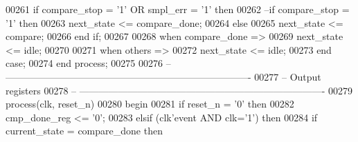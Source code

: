 \begin{DoxyCode}
00261          \textcolor{keywordflow}{if} \textcolor{vhdlchar}{compare_stop} \textcolor{vhdlchar}{=} \textcolor{vhdlchar}{'}\textcolor{vhdllogic}{}\textcolor{vhdllogic}{1}\textcolor{vhdlchar}{'} \textcolor{keywordflow}{OR} \textcolor{vhdlchar}{smpl_err} \textcolor{vhdlchar}{=} \textcolor{vhdlchar}{'}\textcolor{vhdllogic}{}\textcolor{vhdllogic}{1}\textcolor{vhdlchar}{'} \textcolor{keywordflow}{then}
00262 \textcolor{keyword}{         --if compare\_stop = '1' then}
00263             \textcolor{vhdlchar}{next_state} \textcolor{vhdlchar}{<=} \textcolor{vhdlchar}{compare\_done};
00264          \textcolor{keywordflow}{else} 
00265             \textcolor{vhdlchar}{next_state} \textcolor{vhdlchar}{<=} \textcolor{vhdlchar}{compare};
00266          \textcolor{keywordflow}{end} \textcolor{keywordflow}{if};
00267        
00268       \textcolor{keywordflow}{when} \textcolor{vhdlchar}{compare\_done} \textcolor{vhdlchar}{=}\textcolor{vhdlchar}{>} 
00269          \textcolor{vhdlchar}{next_state} \textcolor{vhdlchar}{<=} \textcolor{vhdlchar}{idle};
00270            
00271         \textcolor{keywordflow}{when} \textcolor{keywordflow}{others} \textcolor{vhdlchar}{=}\textcolor{vhdlchar}{>} 
00272             \textcolor{vhdlchar}{next_state} \textcolor{vhdlchar}{<=} \textcolor{vhdlchar}{idle};
00273     \textcolor{keywordflow}{end} \textcolor{keywordflow}{case};
00274 \textcolor{keywordflow}{end} \textcolor{keywordflow}{process};
00275 
00276 \textcolor{keyword}{-- ----------------------------------------------------------------------------}
00277 \textcolor{keyword}{-- Output registers}
00278 \textcolor{keyword}{-- ----------------------------------------------------------------------------}
00279 \textcolor{keywordflow}{process}(clk, reset_n)
00280 \textcolor{vhdlkeyword}{begin}
00281    \textcolor{keywordflow}{if} \textcolor{vhdlchar}{reset_n} \textcolor{vhdlchar}{=} \textcolor{vhdlchar}{'}\textcolor{vhdllogic}{}\textcolor{vhdllogic}{0}\textcolor{vhdlchar}{'} \textcolor{keywordflow}{then} 
00282       \textcolor{vhdlchar}{cmp_done_reg} \textcolor{vhdlchar}{<=} \textcolor{vhdlchar}{'}\textcolor{vhdllogic}{}\textcolor{vhdllogic}{0}\textcolor{vhdlchar}{'};
00283    \textcolor{keywordflow}{elsif} \textcolor{vhdlchar}{(}\textcolor{vhdlchar}{clk}\textcolor{vhdlchar}{'}\textcolor{vhdlkeyword}{event} \textcolor{keywordflow}{AND} \textcolor{vhdlchar}{clk}\textcolor{vhdlchar}{=}\textcolor{vhdlchar}{'}\textcolor{vhdllogic}{}\textcolor{vhdllogic}{1}\textcolor{vhdlchar}{'}\textcolor{vhdlchar}{)} \textcolor{keywordflow}{then} 
00284       \textcolor{keywordflow}{if} \textcolor{vhdlchar}{current_state} \textcolor{vhdlchar}{=} \textcolor{vhdlchar}{compare\_done} \textcolor{keywordflow}{then} 

\end{DoxyCode}
